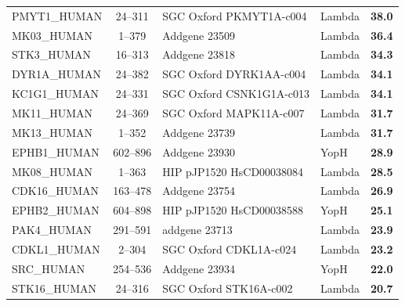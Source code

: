 \documentclass[9pt,lineno]{elife}
\begin{document}
\begin{table}[h!]
\begin{tabular}{p{3cm}cp{3.5cm}p{3cm}c}
PMYT1\_HUMAN & 24--311& SGC Oxford	PKMYT1A-c004 & Lambda                    & \cellcolor{forestgreen!55}\bf{38.0}                            \\
MK03\_HUMAN  & 1--379 & Addgene	23509 &Lambda                    & \cellcolor{forestgreen!55}\bf{36.4}                            \\
STK3\_HUMAN  &16--313 & Addgene	23818 & Lambda                    & \cellcolor{forestgreen!55}\bf{34.3}                            \\
DYR1A\_HUMAN & 24--382& SGC Oxford	DYRK1AA-c004 & Lambda                    & \cellcolor{forestgreen!55}\bf{34.1}                            \\
KC1G1\_HUMAN & 24--331& SGC Oxford	CSNK1G1A-c013 & Lambda                    & \cellcolor{forestgreen!55}\bf{34.1}                            \\
MK11\_HUMAN  & 24--369 & SGC Oxford	MAPK11A-c007 & Lambda                    & \cellcolor{forestgreen!55}\bf{31.7}                            \\
MK13\_HUMAN  &1--352 & Addgene 23739&Lambda                    & \cellcolor{forestgreen!55}\bf{31.7}                            \\
EPHB1\_HUMAN & 602--896& Addgene 23930& YopH         & \cellcolor{forestgreen!55}\bf{28.9}                            \\
MK08\_HUMAN  & 1--363 & HIP pJP1520 HsCD00038084 & Lambda                    & \cellcolor{forestgreen!55}\bf{28.5}                            \\
CDK16\_HUMAN &163--478 & Addgene 23754 & Lambda                    & \cellcolor{forestgreen!55}\bf{26.9}                            \\
EPHB2\_HUMAN &604--898& HIP pJP1520 HsCD00038588 & YopH         & \cellcolor{forestgreen!55}\bf{25.1}                            \\
PAK4\_HUMAN  &291--591 & addgene 23713 & Lambda                    & \cellcolor{forestgreen!55}\bf{23.9}                            \\
CDKL1\_HUMAN & 2--304& SGC Oxford CDKL1A-c024 & Lambda                    & \cellcolor{forestgreen!55}\bf{23.2}                            \\
SRC\_HUMAN   & 254--536 & Addgene 23934 & YopH         & \cellcolor{forestgreen!55}\bf{22.0}                            \\
STK16\_HUMAN & 24--316 & SGC Oxford STK16A-c002 & Lambda                    & \cellcolor{forestgreen!55}\bf{20.7}                            \\

\end{tabular}
\end{table}
\end{document}
